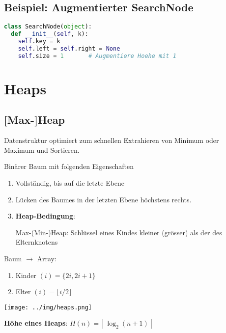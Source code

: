 \documentclass[german]{latex4ei/latex4ei_sheet}
\begin{document}
\begin{sectionbox}
\subsection{Beispiel: Augmentierter SearchNode}\smallskip
\begin{lstlisting}[language=Python]
class SearchNode(object):
  def __init__(self, k):
    self.key = k
    self.left = self.right = None
    self.size = 1       # Augmentiere Hoehe mit 1
\end{lstlisting}\vspace{-6px}
\end{sectionbox}


\newpage
\section{Heaps}

\begin{sectionbox}
\subsection{[Max-]Heap}\smallskip
Datenstruktur optimiert zum schnellen Extrahieren von Minimum oder Maximum und Sortieren.\par\smallskip

Binärer Baum mit folgenden Eigenschaften\par
\begin{enumerate}
    \item Vollständig, bis auf die letzte Ebene
    \item Lücken des Baumes in der letzten Ebene höchstens rechts.
    \item \textbf{Heap-Bedingung}:
    \par Max-(Min-)Heap: Schlüssel eines Kindes kleiner (grösser) als der des Elternknotens
\end{enumerate}\smallskip

Baum $\rightarrow$ Array:
\begin{enumerate}
    \item Kinder $(i)=\{2 i, 2 i+1\}$
    \item Elter $(i)=\lfloor i / 2\rfloor$
\end{enumerate}\smallskip

\texttt{[image: ../img/heaps.png]}\smallskip

\textbf{Höhe eines Heaps}: $H(n)=\left\lceil\log _{2}(n+1)\right\rceil$\par\smallskip

\end{sectionbox}
\end{document}
